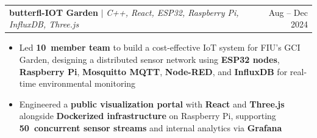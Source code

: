 \documentclass[letterpaper,11pt]{article}
\makeatletter
\newcommand{\resumeItem}[1]{
  \item\small{
    {#1 \vspace{-2pt}}
  }
}
\newcommand{\resumeProjectHeading}[2]{
    \item
    \begin{tabular*}{0.97\textwidth}{l@{\extracolsep{\fill}}r}
      \small#1 & #2 \\
    \end{tabular*}\vspace{-7pt}
}
\newcommand{\resumeItemListStart}{\begin{itemize}}
\newcommand{\resumeItemListEnd}{\end{itemize}\vspace{-5pt}}
\newcommand{\plus}{{\raisebox{0.25ex}{+}}}
\makeatother
\begin{document}
\resumeProjectHeading
{{\href{init-build-iot-garden.github.io/iot_garden/}{\faLink}}
\textbf{\textbf{butterfl-IOT Garden}} $|$ \emph{C++, React, ESP32, Raspberry Pi, InfluxDB, Three.js}} {Aug -- Dec 2024}
\resumeItemListStart
  \resumeItem{Led \textbf{10\plus\ member team} to build a cost-effective IoT system for FIU's GCI Garden, designing a distributed sensor network using \textbf{ESP32 nodes}, \textbf{Raspberry Pi}, \textbf{Mosquitto MQTT}, \textbf{Node-RED}, and \textbf{InfluxDB} for real-time environmental monitoring}
  \resumeItem{Engineered a \textbf{public visualization portal} with \textbf{React} and \textbf{Three.js} alongside \textbf{Dockerized infrastructure} on Raspberry Pi, supporting \textbf{50\plus\ concurrent sensor streams} and internal analytics via \textbf{Grafana}}
\resumeItemListEnd
\end{document}
